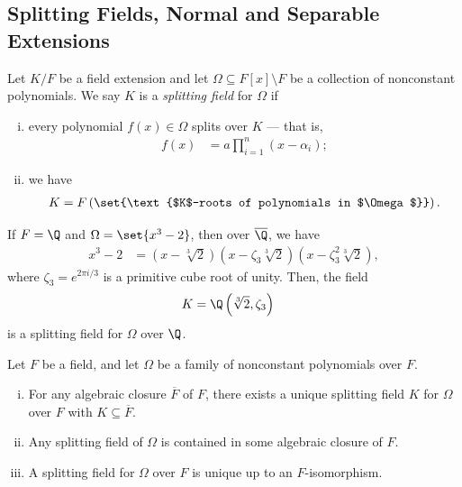 \documentclass[10pt]{mypackage}
\begin{document}
\subsection{Splitting Fields, Normal and Separable Extensions}%
\begin{definition}
  Let $K/F$ be a field extension and let $\Omega\subseteq F[x]\setminus F$ be a collection of nonconstant polynomials. We say $K$ is a \textit{splitting field} for $\Omega$ if
  \begin{enumerate}[(i)]
    \item every polynomial $f(x)\in \Omega$ splits over $K$ --- that is,
      \begin{align*}
        f(x) &= a\prod_{i=1}^{n}\left( x-\alpha_i \right);
      \end{align*}
    \item we have
      \begin{align*}
        K = F\left( \set{\text{$K$-roots of polynomials in $\Omega$}} \right).
      \end{align*}
  \end{enumerate}
\end{definition}
\begin{example}
  If $F = \Q$ and $\Omega = \set{x^3 - 2}$, then over $ \overline{\Q} $, we have
  \begin{align*}
    x^3 - 2 &= \left( x-\sqrt[3]{2} \right)\left( x-\zeta_3\sqrt[3]{2} \right)\left( x-\zeta_3^2\sqrt[3]{2} \right),
  \end{align*}
  where $\zeta_3 = e^{2\pi i/3}$ is a primitive cube root of unity. Then, the field
  \begin{align*}
    K &= \Q\left( \sqrt[3]{2},\zeta_3 \right)
  \end{align*}
  is a splitting field for $\Omega$ over $\Q$.
\end{example}
\begin{proposition}
  Let $F$ be a field, and let $\Omega$ be a family of nonconstant polynomials over $F$.
  \begin{enumerate}[(i)]
    \item For any algebraic closure $ \overline{F} $ of $F$, there exists a unique splitting field $K$ for $\Omega$ over $F$ with $K\subseteq \overline{F}$.
    \item Any splitting field of $\Omega$ is contained in some algebraic closure of $F$.
    \item A splitting field for $\Omega$ over $F$ is unique up to an $F$-isomorphism.
  \end{enumerate}
\end{proposition}
\end{document}
